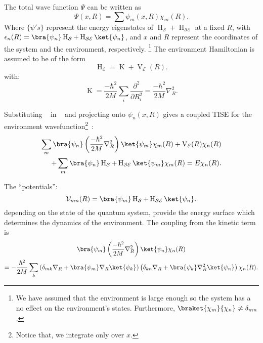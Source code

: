 The total wave function $\Psi$ can be written as
\begin{equation}
    \label{eqn:chap2_total_wavefunction}
    \Psi(x, R) = \sum  \psi_m (x, R) \chi_m(R).
\end{equation}
Where \(\{\psi 's\}\) represent the energy eigenstates of \(\operatorname{H}_{\mathcal{S}} + \operatorname{H}_{\mathcal{SE}}\) at a fixed $R$, with \\ \(\epsilon_n (R) =  \bra{\psi_n}\operatorname{H}_{\mathcal{S}} + \operatorname{H}_{\mathcal{SE}}\ket{\psi_n}\), and $x$ and $R$ represent the coordinates of the system and the environment, respectively.
\footnote{We have assumed that the environment is large enough so the system  has a 
no effect on the environment's states. Furthermore, \(\braket{\chi_m}{\chi_n} \not = \delta_{mn}\).}
The environment Hamiltonian is assumed to be of the form
\begin{equation}
    \label{eqn:chap2_env_hamiltonian}
    \operatorname{H}_{\mathcal{E}} = \operatorname{K} + \operatorname{V}_{\mathcal{E}} (R).
\end{equation}
with:
\begin{equation}
    \operatorname{K} = \frac{-\hbar^2}{2M} \sum_i \frac{\partial^2}{\partial R_i^2} = \frac{-\hbar^2}{2M} 
    \nabla _R^2.
\end{equation}

Substituting ~ in ~ and projecting onto
$\psi_n(x, R)$ gives a coupled TISE for the environment wavefunction\footnote{Notice 
that, we integrate only over $x$.}~\cite{briggs2001derivation}:
\begin{equation}
    \label{eqn:briggs_rost_eq5}
    \begin{aligned}
        \sum_{m} \bra{\psi_n} \left(\frac{-\hbar^2}{2M} \nabla_R^2 \right) \ket{\psi_m} \chi_m(R) 
    + \operatorname{V}_{\mathcal{E}}(R) \chi_n(R)\\
    + \sum_{m} \bra{\psi_n} \operatorname{H}_{\mathcal{S}} + \operatorname{H}_{\mathcal{SE}}\ket{\psi_m}\chi_m(R) = E \chi_n(R).
    \end{aligned}
\end{equation}

The ``potentials'':
\begin{equation}
    \mathcal{V}_{mn}(R) = \bra{\psi_m} \operatorname{H}_{\mathcal{S}} + \operatorname{H}_{\mathcal{SE}}
    \ket{\psi_n}.
\end{equation}
depending on the state of the quantum system, provide the energy surface
which determines the dynamics of the environment. The coupling from the kinetic term is
\begin{equation}
    \begin{gathered}
        \bra{\psi_m} \left(\frac{-\hbar^2}{2M} 
        \nabla_R^2 \right) \ket{\psi_n} \chi_n(R) \\
        = -\frac{\hbar^2}{2M} \sum_k \left(\delta_{mk} \nabla_R+ \bra{\psi_m}\nabla_R
    \ket{\psi_k}\right)\left(\delta_{kn} \nabla_R+ \bra{\psi_k}\nabla_R^2\ket{\psi_n}\right)
     \chi_n(R).
    \end{gathered}
\end{equation}

